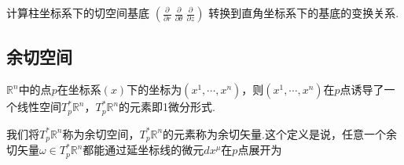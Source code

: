         \begin{exercise}
            计算柱坐标系下的切空间基底
            $\left(\frac{\partial}{\partial r}\ \frac{\partial}{\partial \theta}\ \frac{\partial}{\partial z}\right)$
            转换到直角坐标系下的基底的变换关系.
        \end{exercise}
    \subsection{余切空间}
        \begin{definition}
            $\mathbb{R}^n$中的点$p$在坐标系$(x)$下的坐标为$(x^1,\cdots,x^n)$，则$(x^1,\cdots,x^n)$在$p$点诱导了一个线性空间$T_p^*\mathbb{R}^n$，$T_p^*\mathbb{R}^n$的元素即1微分形式.
        \end{definition}
        我们将$T_p^*\mathbb{R}^n$称为余切空间，$T_p^*\mathbb{R}^n$的元素称为余切矢量.这个定义是说，任意一个余切矢量$\omega\in T_p^*\mathbb{R}^n$都能通过延坐标线的微元$dx^\mu$在$p$点展开为